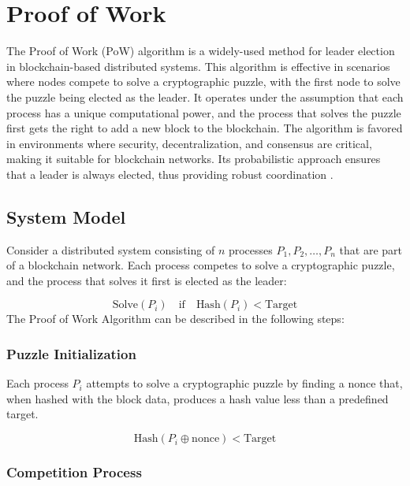 \section{Proof of Work}

The Proof of Work (PoW) algorithm is a widely-used method for leader election in blockchain-based distributed systems. This algorithm is effective in scenarios where nodes compete to solve a cryptographic puzzle, with the first node to solve the puzzle being elected as the leader. It operates under the assumption that each process has a unique computational power, and the process that solves the puzzle first gets the right to add a new block to the blockchain. The algorithm is favored in environments where security, decentralization, and consensus are critical, making it suitable for blockchain networks. Its probabilistic approach ensures that a leader is always elected, thus providing robust coordination \cite{Ref11}.

\subsection{System Model}
Consider a distributed system consisting of \(n\) processes \(P_1, P_2, \ldots, P_n\) that are part of a blockchain network. Each process competes to solve a cryptographic puzzle, and the process that solves it first is elected as the leader:

\[
\text{Solve}(P_i) \quad \text{if} \quad \text{Hash}(P_i) < \text{Target}
\]
The Proof of Work Algorithm can be described in the following steps:

\subsubsection{Puzzle Initialization}

Each process \(P_i\) attempts to solve a cryptographic puzzle by finding a nonce that, when hashed with the block data, produces a hash value less than a predefined target.

\begin{equation}
\text{Hash}(P_i \oplus \text{nonce}) < \text{Target}
\end{equation}

\subsubsection{Competition Process}

